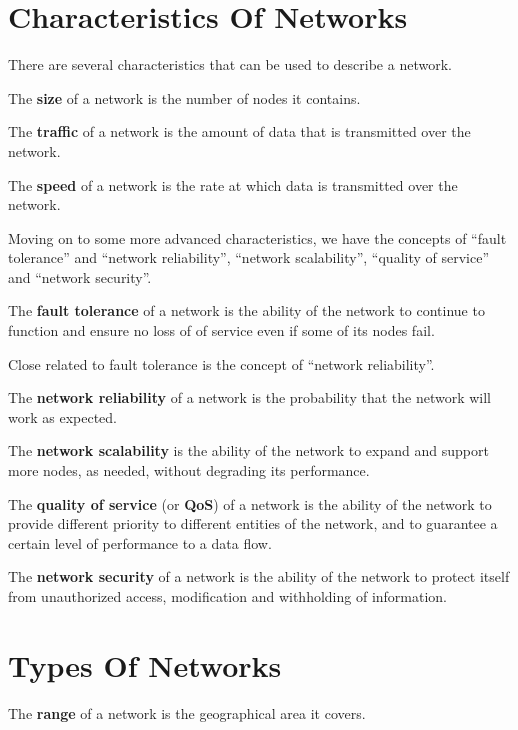 \section{Characteristics Of Networks}

There are several characteristics that can be used to describe a network.

The \textbf{size} of a network is the number of nodes it contains.
\ed

The \textbf{traffic} of a network is the amount of data that is transmitted over the network.
\ed

The \textbf{speed} of a network is the rate at which data is transmitted over the network.
\ed

Moving on to some more advanced characteristics, we have the concepts of ``fault tolerance'' and ``network reliability'',
``network scalability'', ``quality of service'' and ``network security''.

The \textbf{fault tolerance} of a network is the ability of the network to continue to function and ensure no loss of
of service even if some of its nodes fail.
\ed

Close related to fault tolerance is the concept of ``network reliability''.

The \textbf{network reliability} of a network is the probability that the network will work as expected.
\ed

The \textbf{network scalability} is the ability of the network to expand and support more nodes, as needed, without
degrading its performance.
\ed

The \textbf{quality of service} (or \textbf{QoS}) of a network is the ability of the network to provide different
priority to different entities of the network, and to guarantee a certain level of performance to a data flow.
\ed

The \textbf{network security} of a network is the ability of the network to protect itself from unauthorized access,
modification and withholding of information.
\ed

\section{Types Of Networks}

The \textbf{range} of a network is the geographical area it covers.
\ed

